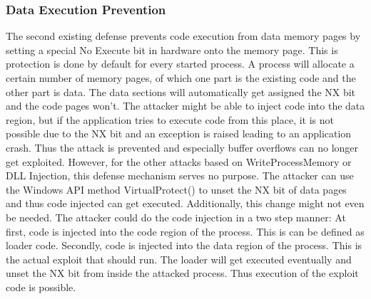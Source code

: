 \subsubsection{Data Execution Prevention}
The second existing defense prevents code execution from data memory pages by setting a special No Execute bit in hardware onto the memory page. This is protection is done by default for every started process. A process will allocate a certain number of memory pages, of which one part is the existing code and the other part is data. The data sections will automatically get assigned the NX bit and the code pages won't. The attacker might be able to inject code into the data region, but if the application tries to execute code from this place, it is not possible due to the NX bit and an exception is raised leading to an application crash. Thus the attack is prevented and especially buffer overflows can no longer get exploited. However, for the other attacks based on WriteProcessMemory or DLL Injection, this defense mechanism serves no purpose. The attacker can use the Windows API method VirtualProtect() to unset the NX bit of data pages and thus code injected can get executed. Additionally, this change might not even be needed. The attacker could do the code injection in a two step manner: At first, code is injected into the code region of the process. This is can be defined as loader code. Secondly, code is injected into the data region of the process. This is the actual exploit that should run. The loader will get executed eventually and unset the NX bit from inside the attacked process. Thus execution of the exploit code is possible.